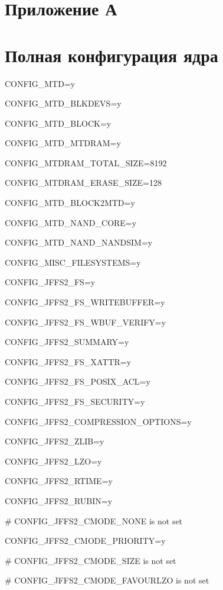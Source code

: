 \section*{Приложение А}
\label{sec:Apendix} 

\section*{Полная конфигурация ядра}


CONFIG\_MTD=y

CONFIG\_MTD\_BLKDEVS=y

CONFIG\_MTD\_BLOCK=y

CONFIG\_MTD\_MTDRAM=y

CONFIG\_MTDRAM\_TOTAL\_SIZE=8192

CONFIG\_MTDRAM\_ERASE\_SIZE=128

CONFIG\_MTD\_BLOCK2MTD=y

CONFIG\_MTD\_NAND\_CORE=y

CONFIG\_MTD\_NAND\_NANDSIM=y

CONFIG\_MISC\_FILESYSTEMS=y

CONFIG\_JFFS2\_FS=y

CONFIG\_JFFS2\_FS\_WRITEBUFFER=y

CONFIG\_JFFS2\_FS\_WBUF\_VERIFY=y

CONFIG\_JFFS2\_SUMMARY=y

CONFIG\_JFFS2\_FS\_XATTR=y

CONFIG\_JFFS2\_FS\_POSIX\_ACL=y

CONFIG\_JFFS2\_FS\_SECURITY=y

CONFIG\_JFFS2\_COMPRESSION\_OPTIONS=y

CONFIG\_JFFS2\_ZLIB=y

CONFIG\_JFFS2\_LZO=y

CONFIG\_JFFS2\_RTIME=y

CONFIG\_JFFS2\_RUBIN=y

\# CONFIG\_JFFS2\_CMODE\_NONE is not set

CONFIG\_JFFS2\_CMODE\_PRIORITY=y

\# CONFIG\_JFFS2\_CMODE\_SIZE is not set

\# CONFIG\_JFFS2\_CMODE\_FAVOURLZO is not set
